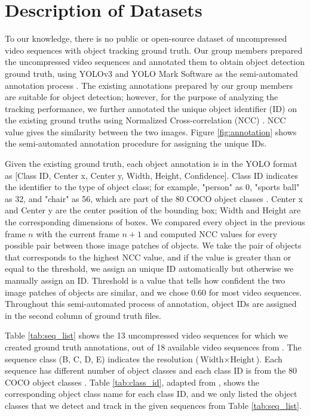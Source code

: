\section{Description of Datasets}
\label{sec:methods/section_a}

To our knowledge, there is no public or open-source dataset of uncompressed video sequences with object tracking ground truth. Our group members prepared the uncompressed video sequences and annotated them to obtain object detection ground truth, using YOLOv3 \cite{redmon_yolov3_2018} and YOLO Mark Software \cite{alexey_alexeyabyolo_mark_2021} as the semi-automated annotation process \cite{choi_vcm_2020}. The existing annotations prepared by our group members are suitable for object detection; however, for the purpose of analyzing the tracking performance, we further annotated the unique object identifier (ID) on the existing ground truths using Normalized Cross-correlation (NCC) \cite{zhao_image_2006}. NCC value gives the similarity between the two images. Figure \ref{fig:annotation} shows the semi-automated annotation procedure for assigning the unique IDs.

Given the existing ground truth, each object annotation is in the YOLO format as [Class ID, Center x, Center y, Width, Height, Confidence]. Class ID indicates the identifier to the type of object class; for example, "person" as 0, "sports ball" as 32, and "chair" as 56, which are part of the 80 COCO object classes \cite{lin_microsoft_2014}. Center x and Center y are the center position of the bounding box; Width and Height are the corresponding dimensions of boxes. We compared every object in the previous frame $n$ with the current frame $n+1$ and computed NCC values for every possible pair between those image patches of objects. We take the pair of objects that corresponds to the highest NCC value, and if the value is greater than or equal to the threshold, we assign an unique ID automatically but otherwise we manually assign an ID. Threshold is a value that tells how confident the two image patches of objects are similar, and we chose 0.60 for most video sequences. Throughout this semi-automated process of annotation, object IDs are assigned in the second column of ground truth files.

Table \ref{tab:seq_list} shows the 13 uncompressed video sequences for which we created ground truth annotations, out of 18 available video sequences from \cite{choi_vcm_2020}. The sequence class (B, C, D, E) indicates the resolution ($\text{Width} \times \text{Height}$). Each sequence has different number of object classes and each class ID is from the 80 COCO object classes \cite{lin_microsoft_2014}. Table \ref{tab:class_id}, adapted from \cite{choi_vcm_2020}, shows the corresponding object class name for each class ID, and we only listed the object classes that we detect and track in the given sequences from Table \ref{tab:seq_list}.
